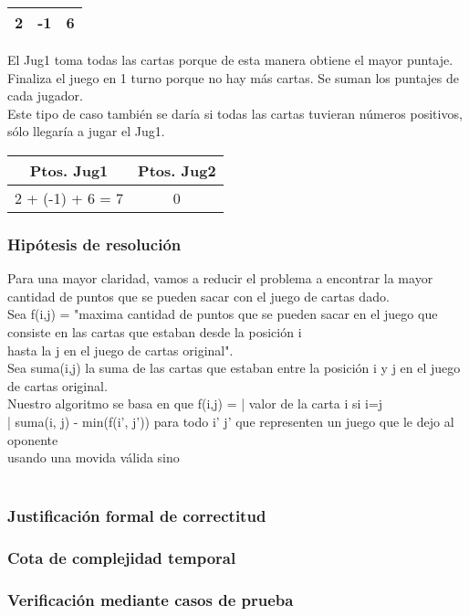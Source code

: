 \documentclass[11pt, a4paper, twoside]{article}
\begin{document}
\begin{ejemplo}\hspace{0em}

	\begin{center}
	  \begin{tabular}{|c|c|c|}
		  \hline
		   2 & -1 & 6 \\
		  \hline
	  \end{tabular} 
	\end{center} 

El Jug1 toma todas las cartas porque de esta manera obtiene el mayor puntaje. \\
Finaliza el juego en 1 turno porque no hay más cartas. Se suman los puntajes de cada jugador.\\
Este tipo de caso también se daría si todas las cartas tuvieran números positivos, sólo llegaría a jugar el Jug1.\\

	\begin{center}
	  \begin{tabular}{|c|c|}
		  \hline
		  Ptos. Jug1 & Ptos. Jug2 \\
		  \hline
		  2 + (-1) + 6 = 7 & 0 \\
		  \hline
	  \end{tabular}
	\end{center} 	
	
\end{ejemplo}



\subsubsection{Hipótesis de resolución}
Para una mayor claridad, vamos a reducir el problema a encontrar la mayor cantidad de puntos que se pueden sacar con el juego de cartas dado.\\
Sea f(i,j) = "maxima cantidad de puntos que se pueden sacar en el juego que consiste en las cartas que estaban desde la posición i \\
hasta la j en el juego de cartas original".\\
Sea suma(i,j) la suma de las cartas que estaban entre la posición i y j en el juego de cartas original.\\
Nuestro algoritmo se basa en que f(i,j) =   | valor de la carta i      si i=j\\
                                            | suma(i, j) - min(f(i', j')) para todo i' j' que representen un juego que le dejo al oponente\\
                                              usando una movida válida        sino\\
\\





\subsubsection{Justificación formal de correctitud}

\subsubsection{Cota de complejidad temporal}

\subsubsection{Verificación mediante casos de prueba}
\end{document}
